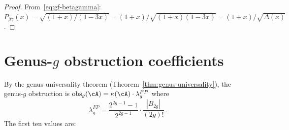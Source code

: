 \begin{proof}
From~\eqref{eq:gf-betagamma}: $P_{\beta\gamma}(x) = \sqrt{(1+x)/(1-3x)} = (1+x)/\sqrt{(1+x)(1-3x)} = (1+x)/\sqrt{\Delta(x)}$.
\end{proof}

\section*{Genus-$g$ obstruction coefficients}
\label{sec:genus-obstruction-table}

By the genus universality theorem
(Theorem~\ref{thm:genus-universality}), the genus-$g$ obstruction
is $\operatorname{obs}_g(\cA) = \kappa(\cA) \cdot \lambda_g^{FP}$
where
\[
\lambda_g^{FP}
  = \frac{2^{2g-1}-1}{2^{2g-1}} \cdot \frac{|B_{2g}|}{(2g)!}\,.
\]
The first ten values are:

